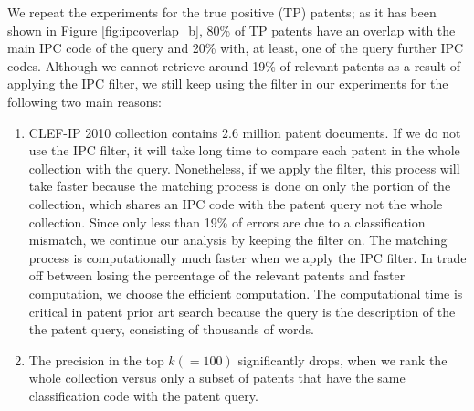 We repeat the experiments for the true positive (TP) patents; as it has been shown in Figure \ref{fig:ipcoverlap_b}, 80\% of TP patents have an overlap with the main IPC code of the query and 20\% with, at least, one of the query further IPC codes. 
Although we cannot retrieve around 19\% of relevant patents as a result of applying the IPC filter, we still keep using the filter in our experiments for the following two main reasons: 
\begin{enumerate}
\item CLEF-IP 2010 collection contains 2.6 million patent documents. If we do not use the IPC filter, it will take long time to compare each patent in the whole collection with the query. Nonetheless, if we apply the filter, this process will take faster because the matching process is done on only the portion of the collection, which shares an IPC code with the patent query not the whole collection. Since only less than 19\% of errors are due to a classification mismatch, we continue our analysis by keeping the filter on. The matching process is computationally much faster when we apply the IPC filter. In trade off between losing the percentage of the relevant patents and faster computation, we choose the efficient computation. The computational time is critical in patent prior art search because the query is the description of the the patent query, consisting of thousands of words.   
\item The precision in the top $k(=100)$ significantly drops, when we rank the whole collection versus only a subset of patents that have the same classification code with the patent query.  
\end{enumerate}

